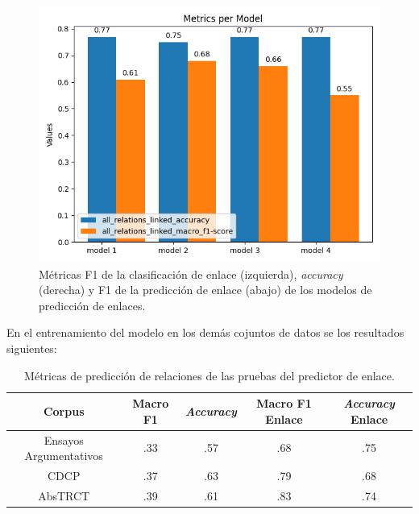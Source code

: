 \begin{figure}[h!]
	\begin{center}
		\includegraphics[scale=.4]{Graphics/persuasive_essays_all_linked_all_relation_linked.png}
	    \caption{Métricas F1 de la clasificación de enlace (izquierda), \emph{accuracy} (derecha) y
				 F1 de la predicción de enlace (abajo) de los modelos de predicción de enlaces.}\label{fig:link_prediction_model_metrics}
	\end{center}
\end{figure}

En el entrenamiento del modelo en los demás cojuntos de datos se los resultados siguientes:

\begin{table}[h!]
	\begin{center}
		\begin{tabular}{|c|c|c|c|c|} \hline
        Corpus		            & Macro F1 & \emph{Accuracy} & Macro F1 Enlace  & \emph{Accuracy} Enlace  \\ \hline
        Ensayos Argumentativos  & .33	   & .57             & .68	    		& .75	    		  	  \\ \hline
        CDCP		            & .37	   & .63	         & .79	    		& .68	    		  	  \\ \hline
        AbsTRCT	                & .39	   & .61	         & .83	    		& .74	    		  	  \\ \hline
        \end{tabular}
	\caption{Métricas de predicción de relaciones de las pruebas del predictor de enlace.}\label{table:test_relation_metrics_link_predictor}
	\end{center}
\end{table}

